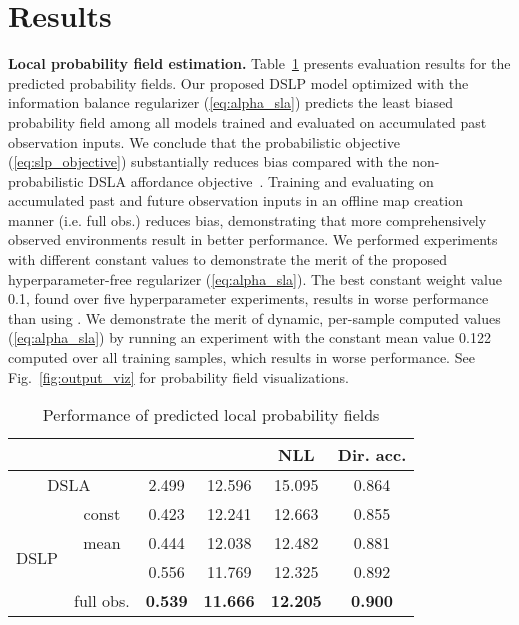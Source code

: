 \documentclass[letterpaper, 10 pt, conference]{ieeeconf}
\begin{document}
\section{Results}

\textbf{Local probability field estimation.} Table~\ref{tab:dense_performance} presents evaluation results for the predicted probability fields. Our proposed DSLP model optimized with the information balance regularizer  (\ref{eq:alpha_sla}) predicts the least biased probability field among all models trained and evaluated on accumulated past observation inputs. We conclude that the probabilistic objective (\ref{eq:slp_objective}) substantially reduces bias compared with the non-probabilistic DSLA affordance objective~\cite{karlsson2020dsla}.
Training and evaluating on accumulated past and future observation inputs in an offline map creation manner (i.e. full obs.) reduces bias, demonstrating that more comprehensively observed environments result in better performance. 
We performed experiments with different constant  values to demonstrate the merit of the proposed hyperparameter-free regularizer  (\ref{eq:alpha_sla}). The best constant weight  value 0.1, found over five hyperparameter experiments, results in worse performance than using .
We demonstrate the merit of dynamic, per-sample computed  values (\ref{eq:alpha_sla}) by running an experiment with the constant mean  value 0.122 computed over all training samples, which results in worse performance.
See Fig.~\ref{fig:output_viz} for probability field visualizations.






\begin{table}[t]\caption{Performance of predicted local probability fields}
\vspace{-4mm}
\begin{center}
\begin{tabular}{|cc|c|c|c|c|}
    \hline
     \multicolumn{2}{|c|}{} &  &  & NLL & Dir. acc. \\
    \hline
    \multicolumn{2}{|c|}{DSLA~\cite{karlsson2020dsla}} & 2.499 & 12.596 & 15.095 &  0.864 \\
    \hline
    \multirow{4}{*}{DSLP} & const  & 0.423 & 12.241 & 12.663 &  0.855 \\
    \cline{2-6}
    & mean  & 0.444 & 12.038 & 12.482 &  0.881 \\
    \cline{2-6}
    &  & 0.556 & 11.769 & 12.325 &  0.892 \\
    \cline{2-6}
    & full obs. & \textbf{0.539} & \textbf{11.666} & \textbf{12.205} & \textbf{0.900} \\
    \hline
\end{tabular}
\label{tab:dense_performance}
\end{center}
\vspace{-3mm}
\end{table}
\end{document}
